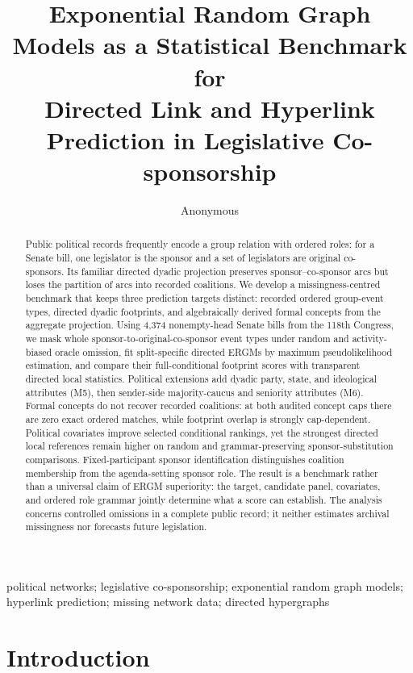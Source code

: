 \documentclass{nws}
\title{Exponential Random Graph Models as a Statistical Benchmark for\\ Directed Link and Hyperlink Prediction in Legislative Co-sponsorship}
\author{Anonymous}
\affil{Blinded for review}
\begin{document}
\begin{abstract}
Public political records frequently encode a group relation with ordered roles: for a Senate bill, one legislator is the sponsor and a set of legislators are original co-sponsors. Its familiar directed dyadic projection preserves sponsor--co-sponsor arcs but loses the partition of arcs into recorded coalitions. We develop a missingness-centred benchmark that keeps three prediction targets distinct: recorded ordered group-event types, directed dyadic footprints, and algebraically derived formal concepts from the aggregate projection. Using 4,374 nonempty-head Senate bills from the 118th Congress, we mask whole sponsor-to-original-co-sponsor event types under random and activity-biased oracle omission, fit split-specific directed ERGMs by maximum pseudolikelihood estimation, and compare their full-conditional footprint scores with transparent directed local statistics. Political extensions add dyadic party, state, and ideological attributes (M5), then sender-side majority-caucus and seniority attributes (M6). Formal concepts do not recover recorded coalitions: at both audited concept caps there are zero exact ordered matches, while footprint overlap is strongly cap-dependent. Political covariates improve selected conditional rankings, yet the strongest directed local references remain higher on random and grammar-preserving sponsor-substitution comparisons. Fixed-participant sponsor identification distinguishes coalition membership from the agenda-setting sponsor role. The result is a benchmark rather than a universal claim of ERGM superiority: the target, candidate panel, covariates, and ordered role grammar jointly determine what a score can establish. The analysis concerns controlled omissions in a complete public record; it neither estimates archival missingness nor forecasts future legislation.
\end{abstract}

\begin{keywords}
political networks; legislative co-sponsorship; exponential random graph models; hyperlink prediction; missing network data; directed hypergraphs
\end{keywords}

\maketitle

\section{Introduction}\label{sec:introduction}
\end{document}
